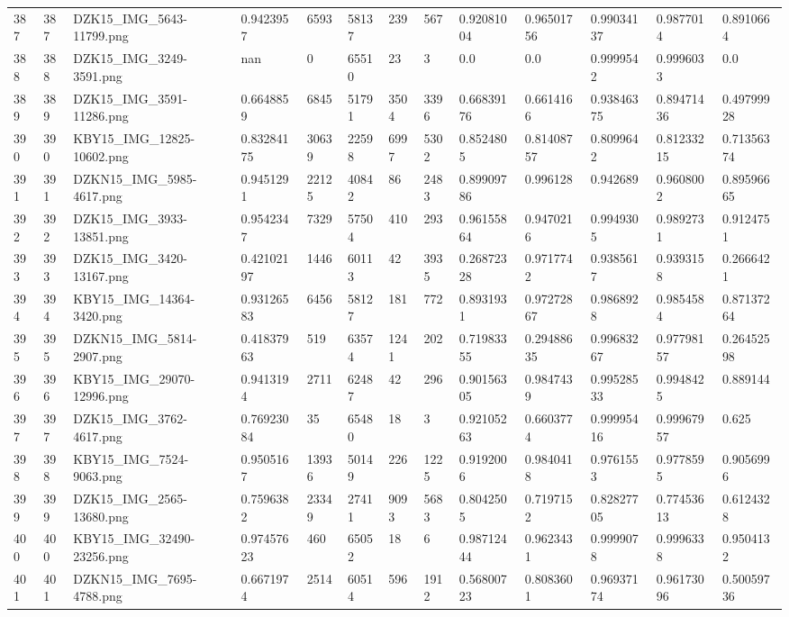 \documentclass[11pt, a4paper, twoside]{report}
\begin{document}
\begin{longtable}[c]{@{}lllllllllllll@{}}
387 & 387 & DZK15\_IMG\_5643-11799.png & 0.9423957 & 6593 & 58137 & 239 & 567 & 0.92081004 & 0.96501756 & 0.99034137 & 0.9877014 & 0.8910664 \\
388 & 388 & DZK15\_IMG\_3249-3591.png & nan & 0 & 65510 & 23 & 3 & 0.0 & 0.0 & 0.9999542 & 0.9996033 & 0.0 \\
389 & 389 & DZK15\_IMG\_3591-11286.png & 0.6648859 & 6845 & 51791 & 3504 & 3396 & 0.66839176 & 0.6614166 & 0.93846375 & 0.89471436 & 0.49799928 \\
390 & 390 & KBY15\_IMG\_12825-10602.png & 0.83284175 & 30639 & 22598 & 6997 & 5302 & 0.8524805 & 0.81408757 & 0.8099642 & 0.81233215 & 0.71356374 \\
391 & 391 & DZKN15\_IMG\_5985-4617.png & 0.9451291 & 22125 & 40842 & 86 & 2483 & 0.89909786 & 0.996128 & 0.942689 & 0.9608002 & 0.89596665 \\
392 & 392 & DZK15\_IMG\_3933-13851.png & 0.9542347 & 7329 & 57504 & 410 & 293 & 0.96155864 & 0.9470216 & 0.9949305 & 0.9892731 & 0.9124751 \\
393 & 393 & DZK15\_IMG\_3420-13167.png & 0.42102197 & 1446 & 60113 & 42 & 3935 & 0.26872328 & 0.9717742 & 0.9385617 & 0.9393158 & 0.2666421 \\
394 & 394 & KBY15\_IMG\_14364-3420.png & 0.93126583 & 6456 & 58127 & 181 & 772 & 0.8931931 & 0.97272867 & 0.9868928 & 0.9854584 & 0.87137264 \\
395 & 395 & DZKN15\_IMG\_5814-2907.png & 0.41837963 & 519 & 63574 & 1241 & 202 & 0.71983355 & 0.29488635 & 0.99683267 & 0.97798157 & 0.26452598 \\
396 & 396 & KBY15\_IMG\_29070-12996.png & 0.9413194 & 2711 & 62487 & 42 & 296 & 0.90156305 & 0.9847439 & 0.99528533 & 0.9948425 & 0.889144 \\
397 & 397 & DZK15\_IMG\_3762-4617.png & 0.76923084 & 35 & 65480 & 18 & 3 & 0.92105263 & 0.6603774 & 0.99995416 & 0.99967957 & 0.625 \\
398 & 398 & KBY15\_IMG\_7524-9063.png & 0.9505167 & 13936 & 50149 & 226 & 1225 & 0.9192006 & 0.9840418 & 0.9761553 & 0.9778595 & 0.9056996 \\
399 & 399 & DZK15\_IMG\_2565-13680.png & 0.7596382 & 23349 & 27411 & 9093 & 5683 & 0.8042505 & 0.7197152 & 0.82827705 & 0.77453613 & 0.6124328 \\
400 & 400 & KBY15\_IMG\_32490-23256.png & 0.97457623 & 460 & 65052 & 18 & 6 & 0.98712444 & 0.9623431 & 0.9999078 & 0.9996338 & 0.9504132 \\
401 & 401 & DZKN15\_IMG\_7695-4788.png & 0.6671974 & 2514 & 60514 & 596 & 1912 & 0.56800723 & 0.8083601 & 0.96937174 & 0.96173096 & 0.50059736 \\

\end{longtable}
\end{document}
